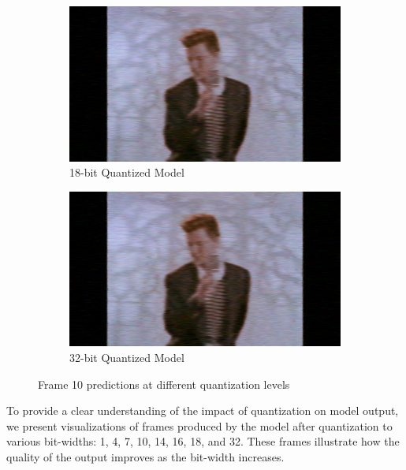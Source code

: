 \begin{figure}[H]
        \begin{subfigure}[b]{0.4\textwidth}
            \centering
            \includegraphics[width=\textwidth]{assets/quantization/frames/rickq18.png}
            \caption{18-bit Quantized Model}
            \label{fig:rickq18}
        \end{subfigure}
        \begin{subfigure}[b]{0.4\textwidth}
            \centering
            \includegraphics[width=\textwidth]{assets/quantization/frames/rickq32.png}
            \caption{32-bit Quantized Model}
            \label{fig:rickq32}
        \end{subfigure}
    
        \caption{Frame 10 predictions at different quantization levels}
        \label{fig:quantization_results}
    \end{figure}

    To provide a clear understanding of the impact of quantization on model output, we present visualizations of frames produced by the model after quantization to various bit-widths: 1, 4, 7, 10, 14, 16, 18, and 32. These frames illustrate how the quality of the output improves as the bit-width increases.

